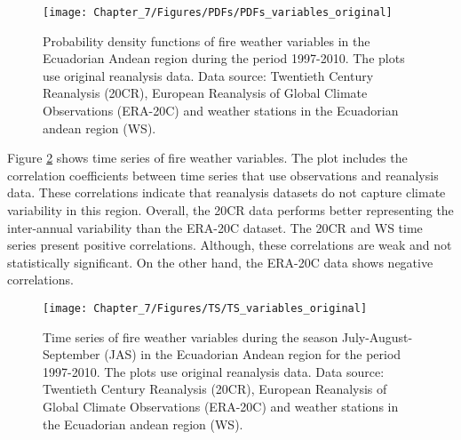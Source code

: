 \begin{figure}[h]
\noindent \begin{centering}
\texttt{[image: Chapter\_7/Figures/PDFs/PDFs\_variables\_original]}
\par\end{centering}

\caption[Probability density functions of fire weather variables in the Ecuadorian
Andean region during the period 1997-2010]{Probability density functions of fire weather variables in the Ecuadorian
Andean region during the period 1997-2010. The plots use original
reanalysis data. Data source: Twentieth Century Reanalysis (20CR),
European Reanalysis of Global Climate Observations (ERA-20C) and weather
stations in the Ecuadorian andean region (WS). \label{fig:Probability density functions of fire weather variables in the Ecuadorian andean region during the period 1997-2010}}
\end{figure}


Figure \ref{fig:Time series of fire weather variables during the season July-August-September in the Ecuadorian andean region for the period 1997-2010}
shows time series of fire weather variables. The plot includes the
correlation coefficients between time series that use observations
and reanalysis data. These correlations indicate that reanalysis datasets
do not capture climate variability in this region. Overall, the 20CR
data performs better representing the inter-annual variability than
the ERA-20C dataset. The 20CR and WS time series present positive
correlations. Although, these correlations are weak and not statistically
significant. On the other hand, the ERA-20C data shows negative correlations.

\begin{figure}[h]
\noindent \begin{centering}
\texttt{[image: Chapter\_7/Figures/TS/TS\_variables\_original]}
\par\end{centering}

\caption[Time series of fire weather variables during the season July-August-September
(JAS) in the Ecuadorian Andean region for the period 1997-2010]{Time series of fire weather variables during the season July-August-September
(JAS) in the Ecuadorian Andean region for the period 1997-2010. The
plots use original reanalysis data. Data source: Twentieth Century
Reanalysis (20CR), European Reanalysis of Global Climate Observations
(ERA-20C) and weather stations in the Ecuadorian andean region (WS).
\label{fig:Time series of fire weather variables during the season July-August-September in the Ecuadorian andean region for the period 1997-2010}}
\end{figure}


